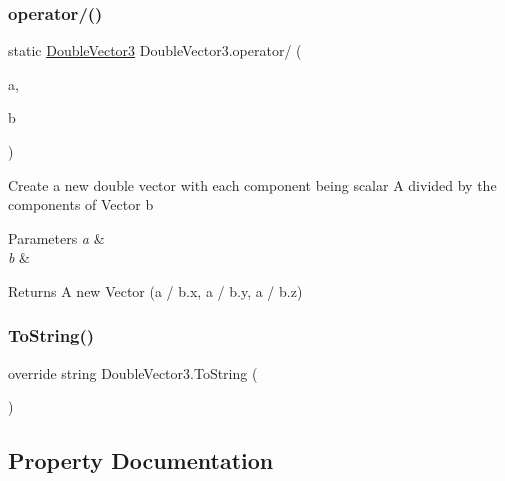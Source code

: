 \subsubsection{\texorpdfstring{operator/()}{operator/()}\hspace{0.1cm}{\footnotesize\ttfamily [2/2]}}
{\footnotesize\ttfamily static \mbox{\hyperlink{class_double_vector3}{Double\+Vector3}} Double\+Vector3.\+operator/ (\begin{DoxyParamCaption}\item[{double}]{a,  }\item[{\mbox{\hyperlink{class_double_vector3}{Double\+Vector3}}}]{b }\end{DoxyParamCaption})\hspace{0.3cm}{\ttfamily [static]}}



Create a new double vector with each component being scalar A divided by the components of Vector b 


\begin{DoxyParams}{Parameters}
{\em a} & \\
\hline
{\em b} & \\
\hline
\end{DoxyParams}
\begin{DoxyReturn}{Returns}
A new Vector (a / b.\+x, a / b.\+y, a / b.\+z)
\end{DoxyReturn}
\mbox{\label{class_double_vector3_a3260bcec4bb8444811215005a3f04865}} 
\subsubsection{\texorpdfstring{ToString()}{ToString()}}
{\footnotesize\ttfamily override string Double\+Vector3.\+To\+String (\begin{DoxyParamCaption}{ }\end{DoxyParamCaption})}



\subsection{Property Documentation}
\mbox{\label{class_double_vector3_a222624a0d77d108f21221e472ac08f05}} 
